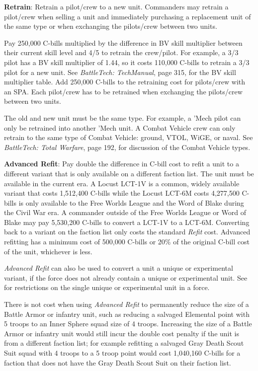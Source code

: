 \item {\bfseries Retrain}: Retrain a pilot/crew to a new unit.
Commanders may retrain a pilot/crew when selling a unit and immediately purchasing a replacement unit of the same type or when exchanging the pilots/crew between two units.

Pay 250,000 C-bills multiplied by the difference in BV skill multiplier between their current skill level and 4/5 to retrain the crew/pilot.
For example, a 3/3 pilot has a BV skill multiplier of 1.44, so it costs 110,000 C-bills to retrain a 3/3 pilot for a new unit.
See \emph{BattleTech: TechManual}, page 315, for the BV skill multiplier table.
Add 250,000 C-bills to the retraining cost for pilots/crew with an SPA.
Each pilot/crew has to be retrained when exchanging the pilots/crew between two units.

The old and new unit must be the same type.
For example, a 'Mech pilot can only be retrained into another 'Mech unit.
A Combat Vehicle crew can only retrain to the same type of Combat Vehicle: ground, VTOL, WiGE, or naval.
See \emph{BattleTech: Total Warfare}, page 192, for discussion of the Combat Vehicle types.

\item {\bfseries Advanced Refit}: Pay double the difference in C-bill cost to refit a unit to a different variant that is only available on a different faction list.
The unit must be available in the current era.
A Locust LCT-1V is a common, widely available variant that costs 1,512,400 C-bills while the Locust LCT-6M costs 4,277,500 C-bills is only available to the Free Worlds League and the Word of Blake during the Civil War era.
A commander outside of the Free Worlds League or Word of Blake may pay 5,530,200 C-bills to convert a LCT-1V to a LCT-6M.
Converting back to a variant on the faction list only costs the standard \emph{Refit} cost.
Advanced refitting has a minimum cost of 500,000 C-bills or 20\% of the original C-bill cost of the unit, whichever is less.

\emph{Advanced Refit} can also be used to convert a unit a unique or experimental variant, if the force does not already contain a unique or experimental unit.
See  for restrictions on the single unique or experimental unit in a force.

There is not cost when using \emph{Advanced Refit} to permanently reduce the size of a Battle Armor or infantry unit, such as reducing a salvaged Elemental point with 5 troops to an Inner Sphere squad size of 4 troops.
Increasing the size of a Battle Armor or infantry unit would still incur the double cost penalty if the unit is from a different faction list; for example refitting a salvaged Gray Death Scout Suit squad with 4 troops to a 5 troop point would cost 1,040,160 C-bills for a faction that does not have the Gray Death Scout Suit on their faction list.

